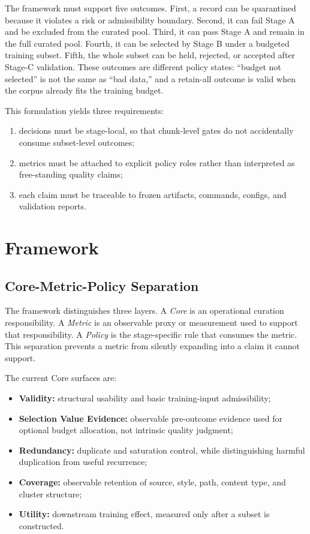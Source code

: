 \documentclass[conference]{IEEEtran}
\begin{document}
The framework must support five outcomes.  First, a record can be quarantined
because it violates a risk or admissibility boundary.  Second, it can fail
Stage A and be excluded from the curated pool.  Third, it can pass Stage A and
remain in the full curated pool.  Fourth, it can be selected by Stage B under a
budgeted training subset.  Fifth, the whole subset can be held, rejected, or
accepted after Stage-C validation.  These outcomes are different policy states:
``budget not selected'' is not the same as ``bad data,'' and a retain-all
outcome is valid when the corpus already fits the training budget.

This formulation yields three requirements:
\begin{enumerate}
    \item decisions must be stage-local, so that chunk-level gates do not
    accidentally consume subset-level outcomes;
    \item metrics must be attached to explicit policy roles rather than
    interpreted as free-standing quality claims;
    \item each claim must be traceable to frozen artifacts, commands, configs,
    and validation reports.
\end{enumerate}

\section{Framework}
\subsection{Core-Metric-Policy Separation}
The framework distinguishes three layers.  A \emph{Core} is an operational
curation responsibility.  A \emph{Metric} is an observable proxy or measurement
used to support that responsibility.  A \emph{Policy} is the stage-specific rule
that consumes the metric.  This separation prevents a metric from silently
expanding into a claim it cannot support.

The current Core surfaces are:
\begin{itemize}
    \item \textbf{Validity:} structural usability and basic training-input
    admissibility;
    \item \textbf{Selection Value Evidence:} observable pre-outcome evidence
    used for optional budget allocation, not intrinsic quality judgment;
    \item \textbf{Redundancy:} duplicate and saturation control, while
    distinguishing harmful duplication from useful recurrence;
    \item \textbf{Coverage:} observable retention of source, style, path,
    content type, and cluster structure;
    \item \textbf{Utility:} downstream training effect, measured only after a
    subset is constructed.
\end{itemize}
\end{document}
